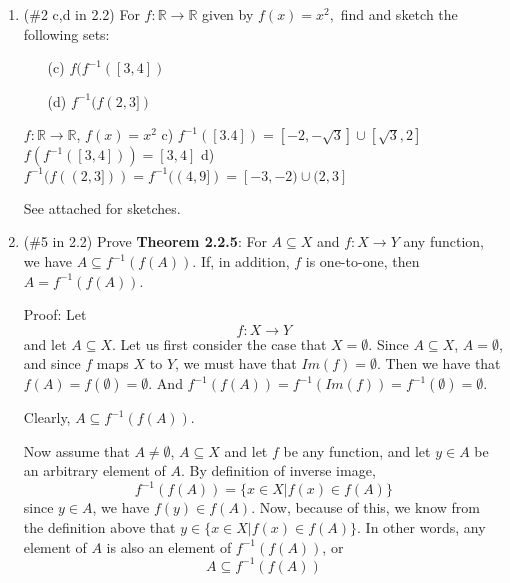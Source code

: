 \documentclass{article}
\begin{document}
\begin{enumerate}
\item{}
(\#2 c,d in 2.2) For $f:\mathbb{R}\to\mathbb{R}$ given by $f(x) = x^2,$ find and sketch the following sets:
  \begin{itemize}
  \item[(c)] $f(f^{-1}([3,4])$
  \item[(d)] $f^{-1}(f(2,3])$
  \end{itemize}
 
  
$f: \mathbb{R} \to \mathbb{R}$, $f(x) = x^2$
\newline\newline
c) $f^{-1}([3.4]) = [-2, -\sqrt{3}] \cup [\sqrt{3}, 2]$
\newline
$f(f^{-1}([3,4])) = [3,4]$
\newline\newline
d) $f^{-1}(f((2,3])) = f^{-1}((4,9]) = [-3,-2) \cup (2,3]$
\newline

See attached for sketches.

\item{}
(\#5 in 2.2) Prove \textbf{Theorem 2.2.5}: For $A\subseteq X$ and $f:X\to Y$ any function, we have $A\subseteq f^{-1}(f(A))$. If, in addition, $f$ is one-to-one, then $A=f^{-1}(f(A))$.
\newline

Proof: Let 
\[f: X \to Y\]
and let $A \subseteq X$.
\newline
Let us first consider the case that $X = \emptyset$. Since $A \subseteq X$, $A = \emptyset$, and since $f$ maps $X$ to $Y$, we must have that $Im(f) = \emptyset$. Then we have that $f(A) = f(\emptyset) = \emptyset$. And $f^{-1}(f(A)) = f^{-1}(Im(f)) = f^{-1}(\emptyset) = \emptyset$.

Clearly, $A \subseteq f^{-1}(f(A))$.
\newline\newline\newline

Now assume that $A \neq \emptyset$, $A \subseteq X$ and let $f$ be any function, and let $y \in A$ be an arbitrary element of $A$. By definition of inverse image,
\begin{equation}
    f^{-1}(f(A)) = \{x\in X| f(x) \in f(A)\}
\end{equation}
since $y \in A$, we have $f(y) \in f(A)$. Now, because of this, we know from the definition above that $y \in \{x \in X | f(x) \in f(A)\}$. In other words, any element of $A$ is also an element of $f^{-1}(f(A))$, or 
\[A \subseteq f^{-1}(f(A))\]



\end{enumerate}
\end{document}
